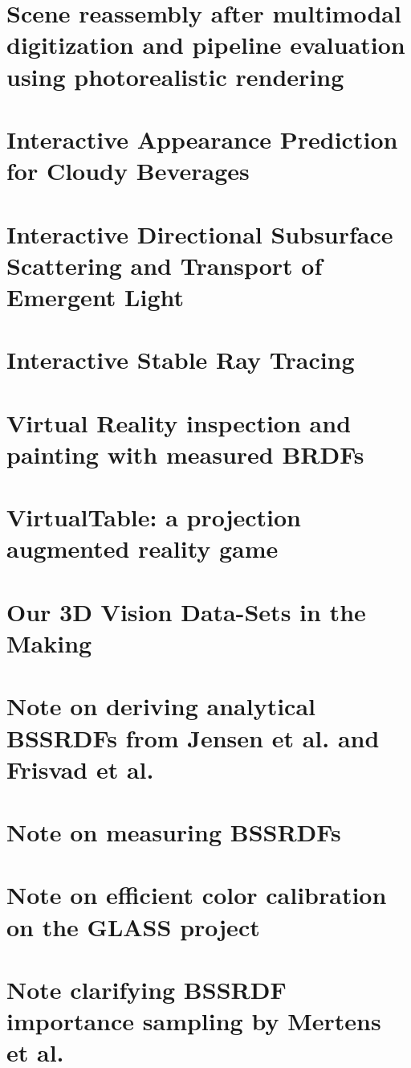 \chapter{Scene reassembly after multimodal digitization and pipeline evaluation using photorealistic rendering}
\label{sec:glass}

%
\chapter{Interactive Appearance Prediction for Cloudy Beverages}
\label{sec:juice}

%
\chapter{Interactive Directional Subsurface Scattering and Transport of Emergent Light}
\label{sec:interactivedirsss}

%
\chapter{Interactive Stable Ray Tracing}
\label{sec:srt}

%
\chapter{Virtual Reality inspection and painting with measured BRDFs}
\label{sec:vrbrdf}

%
\chapter{VirtualTable: a projection augmented reality game}
\label{sec:virtualtable}

%
\chapter{Our 3D Vision Data-Sets in the Making}
\label{sec:robdataset}

%
\chapter{Note on deriving analytical BSSRDFs from Jensen et al. and Frisvad et al.}
\label{sec:jensennote}

%
\chapter{Note on measuring BSSRDFs}
\label{sec:bssrdfnote}

%
\chapter{Note on efficient color calibration on the GLASS project}
\label{sec:colornote}

%
\chapter{Note clarifying BSSRDF importance sampling by Mertens et al.}
\label{sec:mertensnote}


